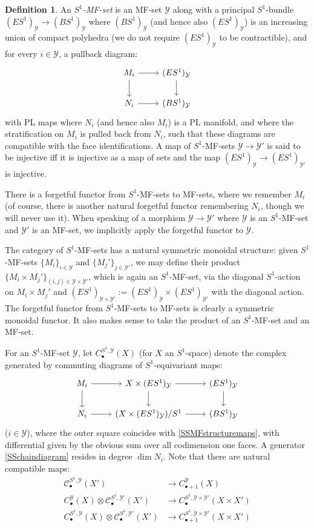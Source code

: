\documentclass[12pt]{article}
\theoremstyle{definition}
\newtheorem{definition}[theorem]{Definition}
\theoremstyle{remark}
\numberwithin{equation}{subsection}
\newcommand{\C}{\mathcal C}
\newcommand{\Y}{\mathcal Y}
\begin{document}
\begin{definition}\label{SSMFdef}
An \emph{$S^1$-MF-set} is an MF-set $\Y$ along with a principal $S^1$-bundle $(ES^1)_\Y\to(BS^1)_\Y$ where $(BS^1)_\Y$ (and hence also $(ES^1)_\Y$) is an increasing union of compact polyhedra (we do not require $(ES^1)_\Y$ to be contractible), and for every $i\in\Y$, a pullback diagram:
\begin{equation}\label{SSMFstructuremaps}
\begin{tikzcd}
M_i\ar{r}\ar{d}&(ES^1)_\Y\ar{d}\\
N_i\ar{r}&(BS^1)_\Y
\end{tikzcd}
\end{equation}
with PL maps where $N_i$ (and hence also $M_i$) is a PL manifold, and where the stratification on $M_i$ is pulled back from $N_i$, such that these diagrams are compatible with the face identifications.  A map of $S^1$-MF-sets $\Y\to\Y'$ is said to be injective iff it is injective as a map of sets and the map $(ES^1)_\Y\to(ES^1)_{\Y'}$ is injective.

There is a forgetful functor from $S^1$-MF-sets to MF-sets, where we remember $M_i$ (of course, there is another natural forgetful functor remembering $N_i$, though we will never use it).  When speaking of a morphism $\Y\to\Y'$ where $\Y$ is an $S^1$-MF-set and $\Y'$ is an MF-set, we implicitly apply the forgetful functor to $\Y$.

The category of $S^1$-MF-sets has a natural symmetric monoidal structure: given $S^1$-MF-sets $\{M_i\}_{i\in\Y}$ and $\{M_j'\}_{j\in\Y'}$, we may define their product $\{M_i\times M_j'\}_{(i,j)\in\Y\times\Y'}$, which is again an $S^1$-MF-set, via the diagonal $S^1$-action on $M_i\times M_j'$ and $(ES^1)_{\Y\times\Y'}:=(ES^1)_\Y\times(ES^1)_{\Y'}$ with the diagonal action.  The forgetful functor from $S^1$-MF-sets to MF-sets is clearly a symmetric monoidal functor.  It also makes sense to take the product of an $S^1$-MF-set and an MF-set.

For an $S^1$-MF-set $\Y$, let $C^{S^1,\Y}_\bullet(X)$ (for $X$ an $S^1$-space) denote the complex generated by commuting diagrams of $S^1$-equivariant maps:
\begin{equation}\label{SSchaindiagram}
\begin{tikzcd}
M_i\ar{r}\ar{d}&X\times(ES^1)_\Y\ar{r}\ar{d}&(ES^1)_\Y\ar{d}\\
N_i\ar{r}&(X\times(ES^1)_\Y)/S^1\ar{r}&(BS^1)_\Y
\end{tikzcd}
\end{equation}
($i\in\Y$), where the outer square coincides with \eqref{SSMFstructuremaps}, with differential given by the obvious sum over all codimension one faces.  A generator \eqref{SSchaindiagram} resides in degree $\dim N_i$.  Note that there are natural compatible maps:
\begin{align}
\C_\bullet^{S^1,\Y}(X')&\to C_{\bullet+1}^\Y(X)\\
C_\bullet^\Y(X)\otimes\C_\bullet^{S^1,\Y'}(X')&\to C_\bullet^{S^1,\Y\times\Y'}(X\times X')\\
C_\bullet^{S^1,\Y}(X)\otimes\C_\bullet^{S^1,\Y'}(X')&\to C_{\bullet+1}^{S^1,\Y\times\Y'}(X\times X')
\end{align}
\end{definition}
\end{document}
